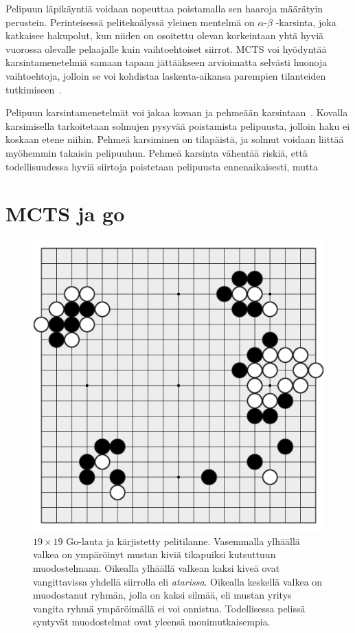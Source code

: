 \documentclass[12pt,finnish]{tktltiki2}
\theoremstyle{definition}
\theoremstyle{remark}
\begin{document}
Pelipuun läpikäyntiä voidaan nopeuttaa poistamalla sen haaroja määrätyin perustein. Perinteisessä pelitekoälyssä yleinen mentelmä on $\alpha$-$\beta$ -karsinta, joka katkaisee hakupolut, kun niiden on osoitettu olevan korkeintaan yhtä hyviä vuorossa olevalle pelaajalle kuin vaihtoehtoiset siirrot. MCTS voi hyödyntää karsintamenetelmiä samaan tapaan jättääkseen arvioimatta selvästi huonoja vaihtoehtoja, jolloin se voi kohdistaa laskenta-aikansa parempien tilanteiden tutkimiseen~\cite{browne}.

Pelipuun karsintamenetelmät voi jakaa kovaan ja pehmeään karsintaan~\cite{browne}. Kovalla karsimisella tarkoitetaan solmujen pysyvää poistamista pelipuusta, jolloin haku ei koskaan etene niihin. Pehmeä karsiminen on tilapäistä, ja solmut voidaan liittää myöhemmin takaisin pelipuuhun. Pehmeä karsinta vähentää riskiä, että todellisuudessa hyviä siirtoja poistetaan pelipuusta ennenaikaisesti, mutta 



\section{MCTS ja go}

\begin{figure}
\centering
\includegraphics[width = 0.8 \textwidth]{go_illustration.png}

\caption{$19 \times 19$ Go-lauta ja kärjistetty pelitilanne. Vasemmalla ylhäällä valkea on ympäröinyt mustan kiviä tikapuiksi kutsuttuun muodostelmaan. Oikealla ylhäällä valkean kaksi kiveä ovat vangittavissa yhdellä siirrolla eli \textit{atarissa}. Oikealla keskellä valkea on muodostanut ryhmän, jolla on kaksi silmää, eli mustan yritys vangita ryhmä ympäröimällä ei voi onnistua. Todellisessa pelissä syntyvät muodostelmat ovat yleensä monimutkaisempia.}
\end{figure}
\end{document}
